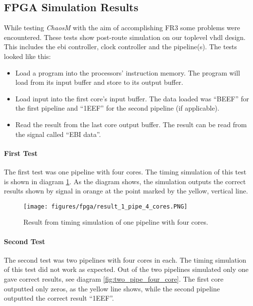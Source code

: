 
\subsection{FPGA Simulation Results}
While testing \textit{ChaosM} with the aim of accomplishing FR3
some problems were encountered. These tests show post-route simulation on our
toplevel vhdl design. This includes the ebi controller, clock controller and the pipeline(s).
The tests looked like this:

\begin{itemize}
\item Load a program into the processors’ instruction memory. The program will load from its input buffer and store to its output buffer.\\
\item Load input into the first core’s input buffer. The data loaded was “BEEF” for the first pipeline and “1EEF” for the second pipeline (if applicable).\\
\item Read the result from the last core output buffer. The result can be read from the signal called “EBI data”.\\
\end{itemize}


\paragraph{First Test}
The first test was one pipeline with four cores. The timing simulation of this test is
 shown in diagram \ref{fig:one_pipe_four_core}. As the diagram shows,
 the simulation outputs the correct results shown by signal in orange at the point
 marked by the yellow, vertical line.

 \begin{figure}[H]
    \texttt{[image: figures/fpga/result\_1\_pipe\_4\_cores.PNG]}
    \caption{Result from timing simulation of one pipeline with four cores.}
    \label{fig:one_pipe_four_core}
\end{figure}

\paragraph{Second Test}
The second test was two pipelines with four cores in each. The timing simulation
of this test did not work as expected. Out of the two pipelines simulated only one
gave correct results, see diagram \ref{fig:two_pipe_four_core}. The first core
outputted only zeros, as the yellow line shows,  while the second pipeline outputted the correct result “1EEF”.

